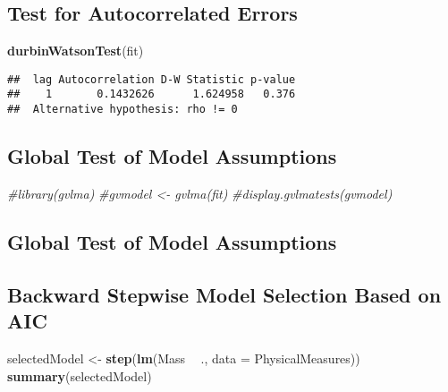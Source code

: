 \documentclass[]{article}
\newenvironment{Shaded}{\begin{snugshade}}{\end{snugshade}}
\newcommand{\KeywordTok}[1]{\textcolor[rgb]{0.13,0.29,0.53}{\textbf{#1}}}
\newcommand{\DataTypeTok}[1]{\textcolor[rgb]{0.13,0.29,0.53}{#1}}
\newcommand{\StringTok}[1]{\textcolor[rgb]{0.31,0.60,0.02}{#1}}
\newcommand{\CommentTok}[1]{\textcolor[rgb]{0.56,0.35,0.01}{\textit{#1}}}
\newcommand{\OperatorTok}[1]{\textcolor[rgb]{0.81,0.36,0.00}{\textbf{#1}}}
\newcommand{\NormalTok}[1]{#1}
\begin{document}
\subsection{Test for Autocorrelated
Errors}\label{test-for-autocorrelated-errors}

\begin{Shaded}
\begin{Highlighting}[]
\KeywordTok{durbinWatsonTest}\NormalTok{(fit)}
\end{Highlighting}
\end{Shaded}

\begin{verbatim}
##  lag Autocorrelation D-W Statistic p-value
##    1       0.1432626      1.624958   0.376
##  Alternative hypothesis: rho != 0
\end{verbatim}

\subsection{Global Test of Model
Assumptions}\label{global-test-of-model-assumptions}

\begin{Shaded}
\begin{Highlighting}[]
\CommentTok{#library(gvlma)}
\CommentTok{#gvmodel <- gvlma(fit)}
\CommentTok{#display.gvlmatests(gvmodel)}
\end{Highlighting}
\end{Shaded}

\subsection{Global Test of Model
Assumptions}\label{global-test-of-model-assumptions-1}

\subsection{Backward Stepwise Model Selection Based on
AIC}\label{backward-stepwise-model-selection-based-on-aic}

\begin{Shaded}
\begin{Highlighting}[]
\NormalTok{selectedModel <-}\StringTok{ }\KeywordTok{step}\NormalTok{(}\KeywordTok{lm}\NormalTok{(Mass }\OperatorTok{~}\StringTok{ }\NormalTok{., }\DataTypeTok{data =}\NormalTok{ PhysicalMeasures))}
\KeywordTok{summary}\NormalTok{(selectedModel)}
\end{Highlighting}
\end{Shaded}
\end{document}
